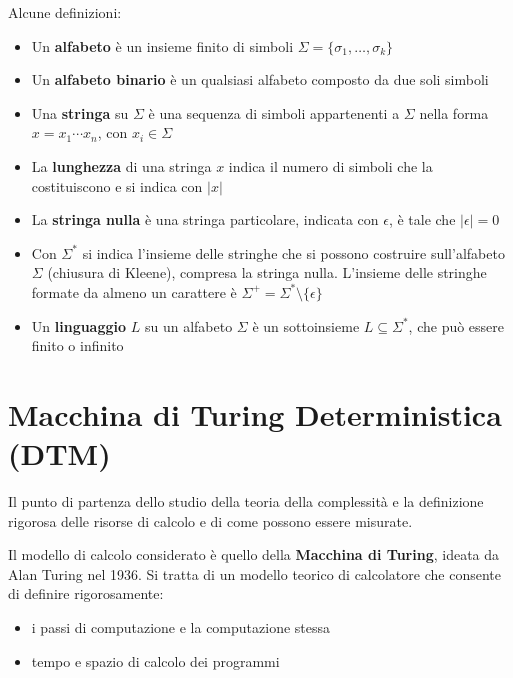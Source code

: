 Alcune definizioni:
\begin{itemize}
	\item Un \textbf{alfabeto} è un insieme finito di simboli $\Sigma = \{\sigma_1, \dots, \sigma_k\}$
	\item Un \textbf{alfabeto binario} è un qualsiasi alfabeto composto da due soli simboli
	\item Una \textbf{stringa} su $\Sigma$ è una sequenza di simboli appartenenti a $\Sigma$ nella forma $x = x_1 \cdots x_n$, con $x_i \in \Sigma$
	\item La \textbf{lunghezza} di una stringa $x$ indica il numero di simboli che la costituiscono e si indica con $|x|$
	\item La \textbf{stringa nulla} è una stringa particolare, indicata con $\epsilon$, è tale che $|\epsilon| = 0$
	\item Con $\Sigma^\ast$ si indica l'insieme delle stringhe che si possono costruire sull'alfabeto $\Sigma$ (chiusura di Kleene), compresa la stringa nulla. L'insieme delle stringhe formate da almeno un carattere è $\Sigma^+ = \Sigma^\ast \setminus \{\epsilon\}$
	\item Un \textbf{linguaggio} $L$ su un alfabeto $\Sigma$ è un sottoinsieme $L \subseteq \Sigma^\ast$, che può essere finito o infinito
\end{itemize}

\section{Macchina di Turing Deterministica (DTM)}
Il punto di partenza dello studio della teoria della complessità e la definizione rigorosa delle risorse di calcolo e di come possono essere misurate.

Il modello di calcolo considerato è quello della \textbf{Macchina di Turing}, ideata da Alan Turing nel 1936. Si tratta di un modello teorico di calcolatore che consente di definire rigorosamente: 
\begin{itemize}
	\item i passi di computazione e la computazione stessa
	\item tempo e spazio di calcolo dei programmi
\end{itemize}

